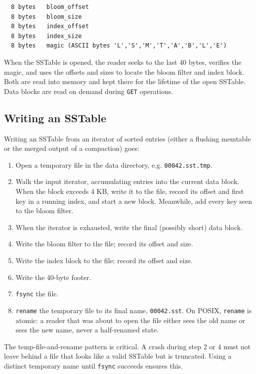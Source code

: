\documentclass[11pt,a4paper]{article}
\begin{document}
\begin{codebox}
\begin{lstlisting}
  8 bytes   bloom_offset
  8 bytes   bloom_size
  8 bytes   index_offset
  8 bytes   index_size
  8 bytes   magic (ASCII bytes 'L','S','M','T','A','B','L','E')
\end{lstlisting}
\end{codebox}

When the SSTable is opened, the reader seeks to the last 40 bytes, verifies the magic, and uses the offsets and sizes to locate the bloom filter and index block. Both are read into memory and kept there for the lifetime of the open SSTable. Data blocks are read on demand during \texttt{GET} operations.

\subsection{Writing an SSTable}
Writing an SSTable from an iterator of sorted entries (either a flushing memtable or the merged output of a compaction) goes:

\begin{enumerate}
\item Open a temporary file in the data directory, e.g. \texttt{00042.sst.tmp}.
\item Walk the input iterator, accumulating entries into the current data block. When the block exceeds 4 KB, write it to the file, record its offset and first key in a running index, and start a new block. Meanwhile, add every key seen to the bloom filter.
\item When the iterator is exhausted, write the final (possibly short) data block.
\item Write the bloom filter to the file; record its offset and size.
\item Write the index block to the file; record its offset and size.
\item Write the 40-byte footer.
\item \texttt{fsync} the file.
\item \texttt{rename} the temporary file to its final name, \texttt{00042.sst}. On POSIX, \texttt{rename} is atomic: a reader that was about to open the file either sees the old name or sees the new name, never a half-renamed state.
\end{enumerate}

The temp-file-and-rename pattern is critical. A crash during step 2 or 4 must not leave behind a file that looks like a valid SSTable but is truncated. Using a distinct temporary name until \texttt{fsync} succeeds ensures this.
\end{document}
